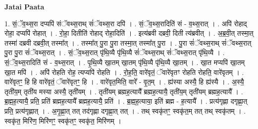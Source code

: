 \documentclass[17pt]{extarticle}
\begin{document}
\textbf{Jatai Paata} \newline

1. सं॒ॅव॒थ्स॒रा दप्यपि॑ संॅवथ्स॒राथ् सं॑ॅवथ्स॒रा दपि॑ । . सं॒ॅव॒थ्स॒रादिति॑ सं - व॒थ्स॒रात् । . अपि॑ रोहाद् रोहा॒ दप्यपि॑ रोहात् । . रो॒हा॒ दितीति॑ रोहाद् रोहा॒दिति॑ । . इत्य॑ब्रवी दब्रवी॒ दिती त्य॑ब्रवीत् । . अ॒ब्र॒वी॒त् तस्मा॒त् तस्मा॑ दब्रवी दब्रवी॒त् तस्मा᳚त् । . तस्मा᳚त् पु॒रा पु॒रा तस्मा॒त् तस्मा᳚त् पु॒रा । . पु॒रा सं॑ॅवथ्स॒राथ् सं॑ॅवथ्स॒रात् पु॒रा पु॒रा सं॑ॅवथ्स॒रात् । . सं॒ॅव॒थ्स॒रात् पृ॑थि॒व्यै पृ॑थि॒व्यै सं॑ॅवथ्स॒राथ् सं॑ॅवथ्स॒रात् पृ॑थि॒व्यै । . सं॒ॅव॒थ्स॒रादिति॑ सं - व॒थ्स॒रात् । . पृ॒थि॒व्यै खा॒तम् खा॒तम् पृ॑थि॒व्यै पृ॑थि॒व्यै खा॒तम् । . खा॒त मप्यपि॑ खा॒तम् खा॒त मपि॑ । . अपि॑ रोहति रोह॒ त्यप्यपि॑ रोहति । . रो॒ह॒ति॒ वारे॑वृतं॒ ॅवारे॑वृतꣳ रोहति रोहति॒ वारे॑वृतम् । . वारे॑वृतꣳ॒॒ हि हि वारे॑वृतं॒ ॅवारे॑वृतꣳ॒॒ हि । . वारे॑वृत॒मिति॒ वारे᳚ - वृ॒त॒म् । . ह्य॑स्या अस्यै॒ हि ह्य॑स्यै । . अ॒स्यै॒ तृती॑य॒म् तृती॑य मस्या अस्यै॒ तृती॑यम् । . तृती॑यम् ब्रह्मह॒त्यायै᳚ ब्रह्मह॒त्यायै॒ तृती॑य॒म् तृती॑यम् ब्रह्मह॒त्यायै᳚ । . ब्र॒ह्म॒ह॒त्यायै॒ प्रति॒ प्रति॑ ब्रह्मह॒त्यायै᳚ ब्रह्मह॒त्यायै॒ प्रति॑ । . ब्र॒ह्म॒ह॒त्याया॒ इति॑ ब्रह्म - ह॒त्यायै᳚ । . प्रत्य॑गृह्णा दगृह्णा॒त् प्रति॒ प्रत्य॑गृह्णात् । . अ॒गृ॒ह्णा॒त् तत् तद॑गृह्णा दगृह्णा॒त् तत् । . तथ् स्वकृ॑तꣳ॒॒ स्वकृ॑त॒म् तत् तथ् स्वकृ॑तम् । . स्वकृ॑त॒ मिरि॑ण॒ मिरि॑णꣳ॒॒ स्वकृ॑तꣳ॒॒ स्वकृ॑त॒ मिरि॑णम् । \newline
\end{document}
